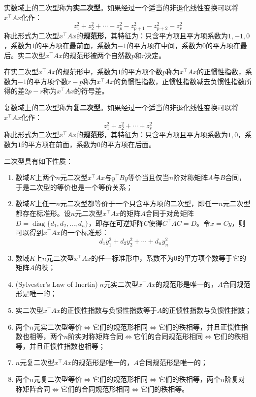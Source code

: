 \begin{definition}
	实数域上的二次型称为\textbf{实二次型}。如果经过一个适当的非退化线性变换可以将$x^{\top}Ax$化作：
	\begin{equation*}
		z_1^2+z_2^2+\cdots+z_p^2-z_{p+1}^2-z_{p+2}^2-z_r^2
	\end{equation*}
	称此形式为二次型$x^{\top}Ax$的\textbf{规范形}，其特征为：只含平方项且平方项系数为$1,-1,0$，系数为$1$的平方项在最前面，系数为$-1$的平方项在中间，系数为$0$的平方项在最后。实二次型$x^{\top}Ax$的规范形被两个自然数$p$和$r$决定。
\end{definition}
\begin{definition}
	在实二次型$x^{\top}Ax$的规范形中，系数为$1$的平方项个数$p$称为$x^{\top}Ax$的正惯性指数，系数为$-1$的平方项个数$r-p$称为$x^{\top}Ax$的负惯性指数，正惯性指数减去负惯性指数所得的差$2p-r$称为$x^{\top}Ax$的符号差。
\end{definition}
\begin{definition}
	复数域上的二次型称为\textbf{复二次型}。如果经过一个适当的非退化线性变换可以将$x^{\top}Ax$化作：
	\begin{equation*}
		z_1^2+z_2^2+\cdots+z_r^2
	\end{equation*}
	称此形式为二次型$x^{\top}Ax$的\textbf{规范形}，其特征为：只含平方项且平方项系数为$1,0$，系数为$1$的平方项在前面，系数为$0$的平方项在后面。
\end{definition}
\begin{property}\label{prop:QuadraticForm}
	二次型具有如下性质：
	\begin{enumerate}
		\item 数域$K$上两个$n$元二次型$x^{\top}Ax$与$y^{\top}By$等价当且仅当$n$阶对称矩阵$A$与$B$合同，于是二次型的等价也是一个等价关系；
		\item 数域$K$上任一$n$元二次型都等价于一个只含平方项的二次型，即任一$n$元二次型都存在标准形。设$n$元二次型$x^{\top}Ax$的矩阵$A$合同于对角矩阵$D=\operatorname{diag}\{d_1,d_2,\dots,d_n\}$，即存在可逆矩阵$C$使得$C^{\top}AC=D$。令$x=Cy$，则可以得到$x^{\top}Ax$的一个标准形：
		\begin{equation*}
			d_1y_1^2+d_2y_2^2+\cdots+d_ny_n^2
		\end{equation*}
		\item 数域$K$上$n$元二次型$x^{\top}Ax$的任一标准形中，系数不为$0$的平方项个数等于它的矩阵$A$的秩；
		\item (Sylvester's Law of Inertia)$\;n$元实二次型$x^{\top}Ax$的规范形是唯一的，$A$合同规范形是唯一的；
		\item 实二次型$x^{\top}Ax$的正惯性指数与负惯性指数等于$A$的正惯性指数与负惯性指数；
		\item 两个$n$元实二次型等价$\iff$它们的规范形相同$\iff$它们的秩相等，并且正惯性指数也相等，两个$n$阶实对称矩阵合同$\iff$它们的合同规范形相同$\iff$它们的秩相等，并且正惯性指数也相等；
		\item $n$元复二次型$x^{\top}Ax$的规范形是唯一的，$A$合同规范形是唯一的；
		\item 两个$n$元复二次型等价$\iff$它们的规范形相同$\iff$它们的秩相等，两个$n$阶复对称矩阵合同$\iff$它们的合同规范形相同$\iff$它们的秩相等。
	\end{enumerate}
\end{property}
